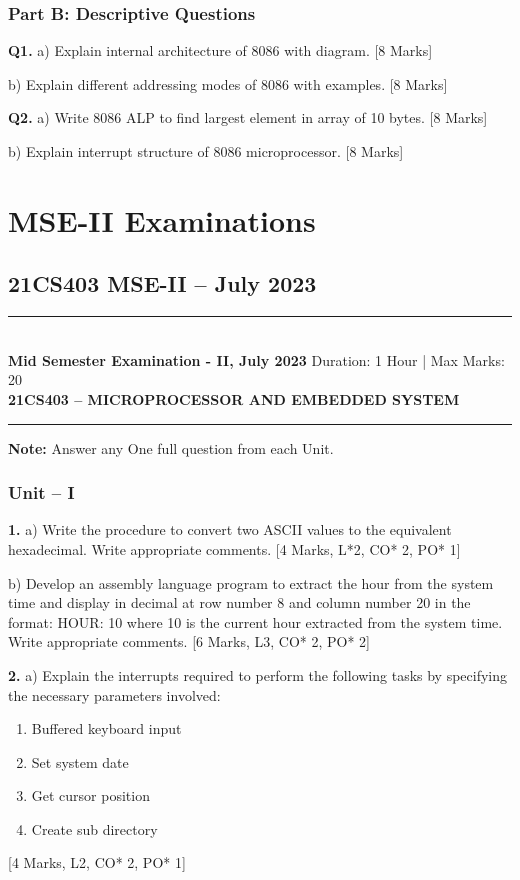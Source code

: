 \documentclass[11pt,a4paper]{article}
\newcommand{\examheader}[4]{
\noindent\rule{\textwidth}{0.5pt}\\
\textbf{#1} \hfill Duration: #3 | Max Marks: #4\\
\textbf{#2}\\
\rule{\textwidth}{0.5pt}
\vspace{0.2cm}
}
\begin{document}
\subsubsection*{Part B: Descriptive Questions}

\textbf{Q1.} a) Explain internal architecture of 8086 with diagram. \hfill [8 Marks]

b) Explain different addressing modes of 8086 with examples. \hfill [8 Marks]

\textbf{Q2.} a) Write 8086 ALP to find largest element in array of 10 bytes. \hfill [8 Marks]

b) Explain interrupt structure of 8086 microprocessor. \hfill [8 Marks]

\section{MSE-II Examinations}

\subsection{21CS403 MSE-II -- July 2023}
\examheader{Mid Semester Examination - II, July 2023}{21CS403 -- MICROPROCESSOR AND EMBEDDED SYSTEM}{1 Hour}{20}

\textbf{Note:} Answer any One full question from each Unit.

\subsubsection*{Unit -- I}

\textbf{1.} a) Write the procedure to convert two ASCII values to the equivalent hexadecimal. Write appropriate comments. \hfill [4 Marks, L*2, CO* 2, PO* 1]

b) Develop an assembly language program to extract the hour from the system time and display in decimal at row number 8 and column number 20 in the format: HOUR: 10 where 10 is the current hour extracted from the system time. Write appropriate comments. \hfill [6 Marks, L3, CO* 2, PO* 2]

\textbf{2.} a) Explain the interrupts required to perform the following tasks by specifying the necessary parameters involved:
\begin{enumerate}[label=\roman*.]
\item Buffered keyboard input
\item Set system date
\item Get cursor position
\item Create sub directory
\end{enumerate}
\hfill [4 Marks, L2, CO* 2, PO* 1]
\end{document}
